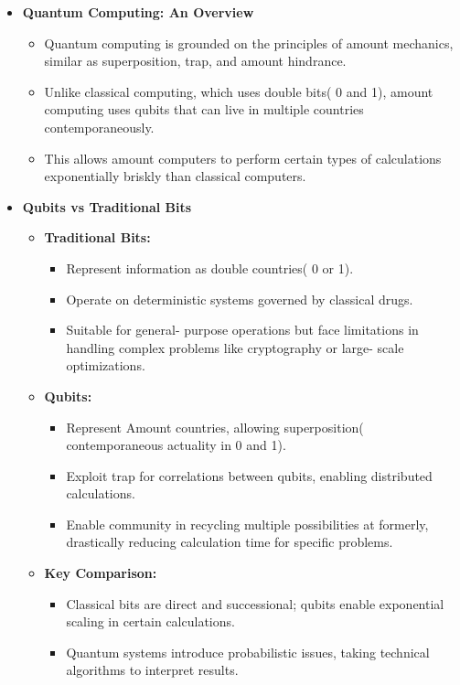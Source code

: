 \documentclass[12pt,a4paper]{article}
\begin{document}
\newpage
\begin{itemize}
    \item \textbf{Quantum Computing: An Overview}
    \begin{itemize}
        \item Quantum computing is grounded on the principles of amount mechanics, similar as superposition, trap, and amount hindrance.
        \item Unlike classical computing, which uses double bits( 0 and 1), amount computing uses qubits that can live in multiple countries contemporaneously.
        \item This allows amount computers to perform certain types of calculations exponentially briskly than classical computers.
    \end{itemize}

    \item \textbf{Qubits vs Traditional Bits}
    \begin{itemize}
        \item \textbf{Traditional Bits:} 
        \begin{itemize}
            \item Represent information as double countries( 0 or 1).
            \item Operate on deterministic systems governed by classical drugs.
            \item Suitable for general- purpose operations but face limitations in handling complex problems like cryptography or large- scale optimizations.
        \end{itemize}
        \item \textbf{Qubits:} 
        \begin{itemize}
           \item Represent Amount countries, allowing superposition( contemporaneous actuality in 0 and 1).
           \item Exploit trap for correlations between qubits, enabling distributed calculations.
           \item Enable community in recycling multiple possibilities at formerly, drastically reducing calculation time for specific problems.
        \end{itemize}
        \item \textbf{Key Comparison:}
        \begin{itemize}
            \item Classical bits are direct and successional; qubits enable exponential scaling in certain calculations.
            \item Quantum systems introduce probabilistic issues, taking technical algorithms to interpret results.
        \end{itemize}
    \end{itemize}


\end{itemize}
\end{document}
